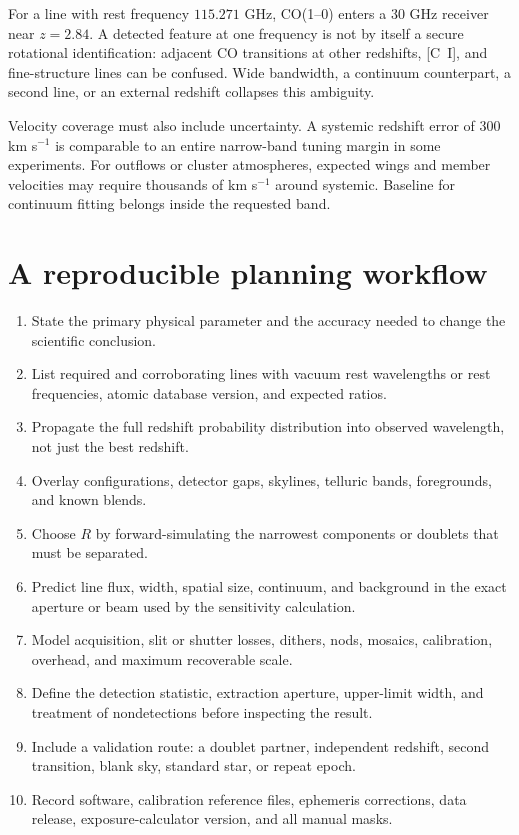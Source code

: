 For a line with rest frequency $115.271$ GHz, CO(1--0) enters a $30$ GHz
receiver near $z=2.84$. A detected feature at one frequency is not by itself a
secure rotational identification: adjacent CO transitions at other redshifts,
[C~I], and fine-structure lines can be confused. Wide bandwidth, a continuum
counterpart, a second line, or an external redshift collapses this ambiguity.

Velocity coverage must also include uncertainty. A systemic redshift error of
$300$ km s$^{-1}$ is comparable to an entire narrow-band tuning margin in some
experiments. For outflows or cluster atmospheres, expected wings and member
velocities may require thousands of km s$^{-1}$ around systemic. Baseline for
continuum fitting belongs inside the requested band.

\section{A reproducible planning workflow}

\begin{enumerate}
 \item State the primary physical parameter and the accuracy needed to change
 the scientific conclusion.
 \item List required and corroborating lines with vacuum rest wavelengths or
 rest frequencies, atomic database version, and expected ratios.
 \item Propagate the full redshift probability distribution into observed
 wavelength, not just the best redshift.
 \item Overlay configurations, detector gaps, skylines, telluric bands,
 foregrounds, and known blends.
 \item Choose $R$ by forward-simulating the narrowest components or doublets
 that must be separated.
 \item Predict line flux, width, spatial size, continuum, and background in
 the exact aperture or beam used by the sensitivity calculation.
 \item Model acquisition, slit or shutter losses, dithers, nods, mosaics,
 calibration, overhead, and maximum recoverable scale.
 \item Define the detection statistic, extraction aperture, upper-limit width,
 and treatment of nondetections before inspecting the result.
 \item Include a validation route: a doublet partner, independent redshift,
 second transition, blank sky, standard star, or repeat epoch.
 \item Record software, calibration reference files, ephemeris corrections,
 data release, exposure-calculator version, and all manual masks.
\end{enumerate}

